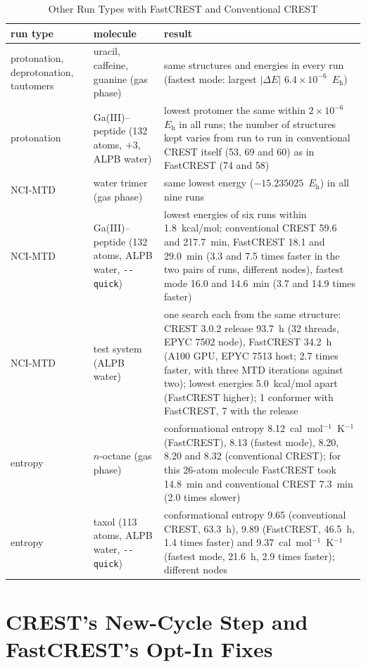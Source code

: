 \documentclass[journal=jctcce,manuscript=suppinfo]{achemso}
\newcommand{\Eh}{\ensuremath{E_\mathrm{h}}}
\newcommand{\quickflag}{\texttt{-{}-quick}}
\begin{document}
\begin{table}[tbp]
\caption{Other Run Types with FastCREST and Conventional CREST}
\label{tab:si-modes}
\small
\begin{tabular}{@{}L{0.17\textwidth}L{0.25\textwidth}L{0.52\textwidth}@{}}
\toprule
run type & molecule & result \\
\midrule
protonation, deprotonation, tautomers & uracil, caffeine, guanine (gas phase) & same structures and energies in every run (fastest mode: largest $|\Delta E|$ $6.4\times10^{-6}$~\Eh) \\
protonation & Ga(III)--peptide (132 atoms, $+3$, ALPB water) & lowest protomer the same within $2\times10^{-6}$~\Eh{} in all runs; the number of structures kept varies from run to run in conventional CREST itself (53, 69 and 60) as in FastCREST (74 and 58) \\
NCI-MTD & water trimer (gas phase) & same lowest energy ($-15.235025$~\Eh) in all nine runs \\
NCI-MTD & Ga(III)--peptide (132 atoms, ALPB water, \quickflag) & lowest energies of six runs within 1.8~kcal/mol; conventional CREST 59.6 and 217.7~min, FastCREST 18.1 and 29.0~min (3.3 and 7.5 times faster in the two pairs of runs, different nodes), fastest mode 16.0 and 14.6~min (3.7 and 14.9 times faster) \\
NCI-MTD & test system (ALPB water) & one search each from the same structure: CREST 3.0.2 release 93.7~h (32 threads, EPYC 7502 node), FastCREST 34.2~h (A100 GPU, EPYC 7513 host; 2.7 times faster, with three MTD iterations against two); lowest energies 5.0~kcal/mol apart (FastCREST higher); 1 conformer with FastCREST, 7 with the release \\
entropy & $n$-octane (gas phase) & conformational entropy 8.12~cal~mol$^{-1}$~K$^{-1}$ (FastCREST), 8.13 (fastest mode), 8.20, 8.20 and 8.32 (conventional CREST); for this 26-atom molecule FastCREST took 14.8~min and conventional CREST 7.3~min (2.0 times slower) \\
entropy & taxol (113 atoms, ALPB water, \quickflag) & conformational entropy 9.65 (conventional CREST, 63.3~h), 9.89 (FastCREST, 46.5~h, 1.4 times faster) and 9.37~cal~mol$^{-1}$~K$^{-1}$ (fastest mode, 21.6~h, 2.9 times faster); different nodes \\
\bottomrule
\end{tabular}
\end{table}

\section{CREST's New-Cycle Step and FastCREST's Opt-In Fixes}
\label{si:cycle}
\end{document}
